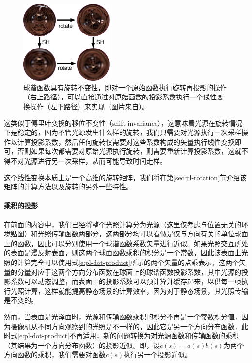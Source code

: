 \begin{figure}
	\sidecaption
	\includegraphics[width=0.42\textwidth]{figures/prt/sh-rotational-invariance}
	\caption{球谐函数具有旋转不变性，即对一个原始函数执行旋转再投影的操作（右上路径），可以直接通过对原始函数的投影系数执行一个线性变换操作（左下路径）来实现（图片来自\cite{a:StupidSphericalHarmonicsSHTricks}）。}
	\label{f:pl-sh-rotational-invariance}
\end{figure}

这类似于傅里叶变换的移位不变性（shift invariance），这意味着光源在旋转情况下是稳定的，因为不管光源发生什么样的旋转，我们只需要对光源执行一次采样操作以计算投影系数，然后任何旋转仅需要对这些系数构成的矢量执行线性变换即可，否则如果每次都需要对原始光源执行旋转，则需要重新计算投影系数，这就不得不对光源进行另一次采样，从而可能导致时间走样。

这个线性变换本质上是一个高维的旋转矩阵，我们将在第\ref{sec:pl-rotation}节介绍该矩阵的计算方法以及旋转的另外一些特性。




\paragraph{乘积的投影}
在前面的内容中，我们已经将整个光照计算分为光源（这里仅考虑与位置无关的环境贴图）和光照传输函数两部分，这两部分均可以看做是仅与方向有关的单位球面上的函数，因此可以分别使用一个球谐函数系数矢量进行近似。如果光照交互所处的表面是漫反射表面，则这两个球面函数乘积的积分是一个常数，因此该表面上光照的计算完全可以使用式\ref{e:pl-dot-product}所示的两个矢量的点乘表示，这两个矢量的分量对应于这两个方向分布函数在球面上的球谐函数投影系数，其中光源的投影系数可以动态调整，而表面上的投影系数可以预计算并缓存起来，以供每一帧执行光照计算，这样就能提高静态场景的计算效率，因为对于静态场景，其光照传输是不变的。

然而，当表面是光泽面时，光源和传输函数乘积的积分不再是一个常数积分值，因为摄像机从不同方向观察到的光照是不一样的，因此它是另一个方向分布函数，此时式\ref{e:pl-dot-product}不再适用，新的问题转换为对光源函数和传输函数的乘积（其结果为一个方向分布函数）的投影近似。即，设$c(s)=a(s)b(s)$为两个方向函数的乘积，我们需要对函数$c(s)$执行另一个投影近似。

